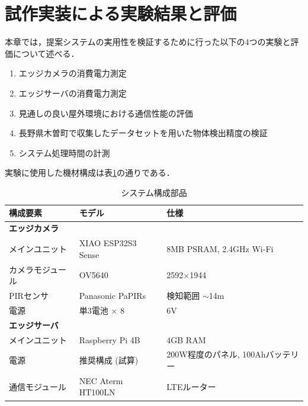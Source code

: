 \documentclass[technicalreport]{ieicej}
\begin{document}
\section{試作実装による実験結果と評価}
本章では，提案システムの実用性を検証するために行った以下の4つの実験と評価について述べる．
\begin{enumerate}
    \item エッジカメラの消費電力測定
    \item エッジサーバの消費電力測定
    \item 見通しの良い屋外環境における通信性能の評価
    \item 長野県木曽町で収集したデータセットを用いた物体検出精度の検証
    \item システム処理時間の計測
\end{enumerate}
実験に使用した機材構成は表\ref{tab:components}の通りである．

\begin{table}[tb]
    \caption{システム構成部品}
    \label{tab:components}
    \centering
    \footnotesize
    \begin{tabular}{l|l|l}
        \hline
        構成要素     & モデル                   & 仕様                      \\
        \hline \hline
        \multicolumn{3}{l}{\textbf{エッジカメラ}}                        \\
        \hline
        メインユニット  & XIAO ESP32S3 Sense    & 8MB PSRAM, 2.4GHz Wi-Fi \\
        カメラモジュール & OV5640                & 2592$\times$1944        \\
        PIRセンサ   & Panasonic PaPIRs      & 検知範囲 $\sim$14m          \\
        電源       & 単3電池 $\times$ 8       & 6V                      \\
        \hline \hline
        \multicolumn{3}{l}{\textbf{エッジサーバ}}                        \\
        \hline
        メインユニット  & Raspberry Pi 4B       & 4GB RAM                 \\
        電源       & 推奨構成 (試算)          & 200W程度のパネル, 100Ahバッテリー  \\
        通信モジュール  & NEC Aterm HT100LN     & LTEルーター                 \\
        \hline
    \end{tabular}
\end{table}
\end{document}
